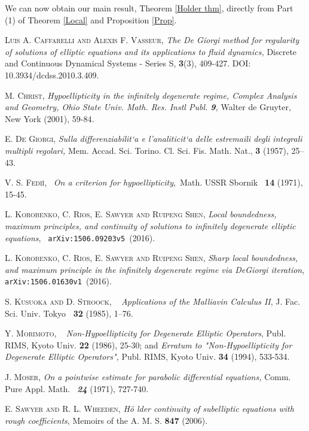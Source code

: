 \documentclass{amsart}
\theoremstyle{plain}
\numberwithin{equation}{section}
\begin{document}
We can now obtain our main result,
Theorem \ref{Holder thm}, directly from Part (1) of Theorem \ref{Local} and Proposition%
\ref{Prop}.

\begin{thebibliography}{KoRiSaSh1}
	 \textsc{Luis A. Caffarelli and Alexis F. Vasseur,} 
	\textit{The De Giorgi method for regularity of solutions of elliptic
		equations and its applications to fluid dynamics,} Discrete and Continuous
	Dynamical Systems - Series S, \textbf{3}(3), 409-427. DOI:
	10.3934/dcdss.2010.3.409.
	
	 {\textsc{M. Christ, }}\textit{Hypoellipticity in the
		infinitely degenerate regime, Complex Analysis and Geometry, Ohio State
		Univ. Math. Res. Instl Publ. \textbf{9}, }Walter de Gruyter, New York
	(2001), 59-84\textit{.}
	
	 \textsc{E. De Giorgi,} \textit{Sulla differenziabilit`a e
		l'analiticit`a delle estremaili degli integrali multipli regolari,} Mem.
	Accad. Sci. Torino. Cl. Sci. Fis. Math. Nat., \textbf{3} (1957), 25--43.
	
	 {\textsc{V. S. Fedi\u{\i},} \textsc{\ }\textit{On a
			criterion for hypoellipticity},\textit{\ }Math. USSR Sbornik\textit{\ }%
		\textbf{14} (1971), 15-45.}
	
	 \textsc{L. Korobenko, C. Rios, E. Sawyer and
		Ruipeng Shen,} \textit{Local boundedness, maximum principles, and continuity
		of solutions to infinitely degenerate elliptic equations}, \texttt{%
		arXiv:1506.09203v5 }(2016).
	
	 \textsc{L. Korobenko, C. Rios, E. Sawyer and
		Ruipeng Shen,} \textit{Sharp local boundedness, and maximum principle in the
		infinitely degenerate regime via DeGiorgi iteration}, \texttt{%
		arXiv:1506.01630v1 }(2016).
	
	 {\textsc{S. Kusuoka and D. Stroock,} \textsc{\ }%
		\textit{Applications of the Malliavin Calculus II}, J. Fac. Sci. Univ. Tokyo 
		\textbf{\ 32} (1985), 1--76. }
	
	 {\textsc{Y. Morimoto,} \textsc{\ }\textit{%
			Non-Hypoellipticity for Degenerate Elliptic Operators}, Publ. RIMS, Kyoto
		Univ. \textbf{22} (1986), 25-30; and \textit{Erratum to "Non-Hypoellipticity
			for Degenerate Elliptic Operators",} Publ. RIMS, Kyoto Univ. \textbf{34}
		(1994), 533-534.}
	
	 \textsc{J. }{\textsc{Moser, }}\textit{On a pointwise
		estimate for parabolic differential equations, }Comm. Pure Appl. Math.%
	\textit{\ \textbf{24} }(1971), 727-740.
	
	 \textsc{E. Sawyer and R. L. Wheeden,} \textit{H\"{o}%
		lder continuity of subelliptic equations with rough coefficients}, Memoirs
	of the A. M. S. \textbf{847} (2006).
\end{thebibliography}
\end{document}
